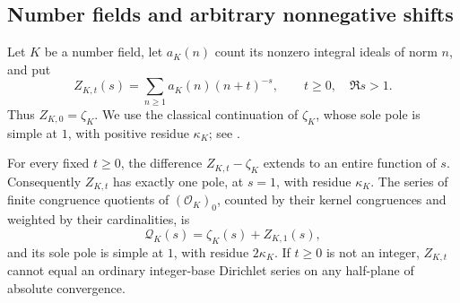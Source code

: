 \subsection{Number fields and arbitrary nonnegative shifts}\label{sec:dedekind-shift}
Let $K$ be a number field, let $a_K(n)$ count its nonzero integral ideals of norm $n$, and put
\[
 Z_{K,t}(s)=\sum_{n\ge1}a_K(n)(n+t)^{-s},\qquad t\ge0,\quad\Re s>1.
\]
Thus $Z_{K,0}=\zeta_K$. We use the classical continuation of $\zeta_K$, whose sole pole is simple at $1$, with positive residue $\kappa_K$; see \citet[Chapter VII, \S5, Proposition 5.2 and Corollary 5.11]{NeukirchShift}.

\begin{proposition}\label{prop:dedekind-all-shifts}
For every fixed $t\ge0$, the difference $Z_{K,t}-\zeta_K$ extends to an entire function of $s$. Consequently $Z_{K,t}$ has exactly one pole, at $s=1$, with residue $\kappa_K$. The series of finite congruence quotients of $(\mathcal O_K)_0$, counted by their kernel congruences and weighted by their cardinalities, is
\[
 \mathcal Q_K(s)=\zeta_K(s)+Z_{K,1}(s),
\]
and its sole pole is simple at $1$, with residue $2\kappa_K$.
If $t\ge0$ is not an integer, $Z_{K,t}$ cannot equal an ordinary integer-base Dirichlet series on any half-plane of absolute convergence.
\end{proposition}
